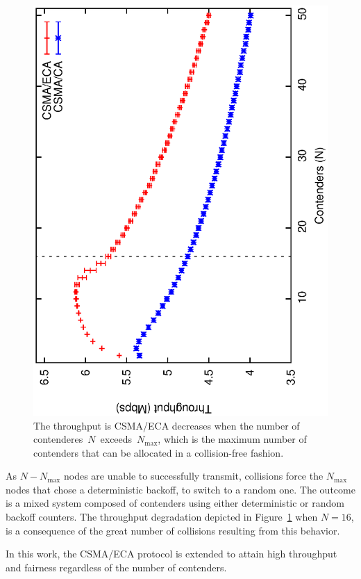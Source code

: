 \begin{figure}[htbp]
  \centering
  \includegraphics[width=0.7\linewidth, angle = -90]{figures/errorPlots/ECA-vs-CA-fixed.eps}
  \caption{The throughput is CSMA/ECA decreases when the number of contenderes~$N$~exceeds~$N_{\max}$, which is the maximum number of contenders that can be allocated in a collision-free fashion.
  \label{fig:throughput}}
\end{figure}

As $N-N_{\max}$ nodes are unable to successfully transmit, collisions force the $N_{\max}$ nodes that chose a deterministic backoff, to switch to a random one. The outcome is a mixed system composed of contenders using either deterministic or random backoff counters. The throughput degradation depicted in Figure~\ref{fig:throughput} when $N=16$, is a consequence of the great number of collisions resulting from this behavior.

In this work, the CSMA/ECA protocol is extended to attain high throughput and fairness regardless of the number of contenders.